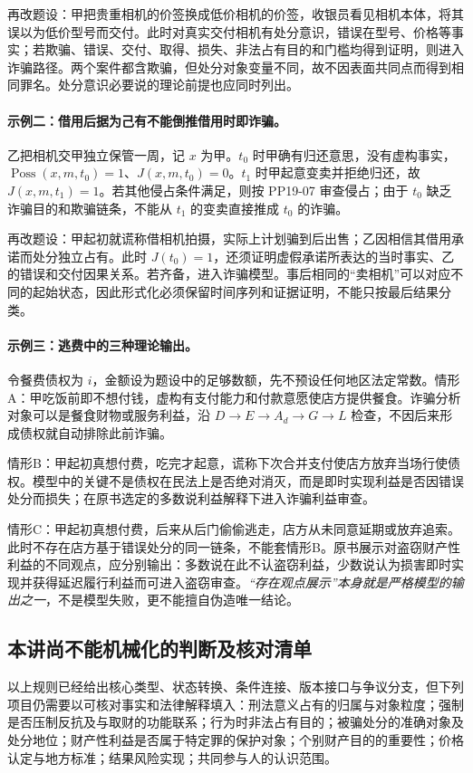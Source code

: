 再改题设：甲把贵重相机的价签换成低价相机的价签，收银员看见相机本体，将其误以为低价型号而交付。此时对真实交付相机有处分意识，错误在型号、价格等事实；若欺骗、错误、交付、取得、损失、非法占有目的和门槛均得到证明，则进入诈骗路径。两个案件都含欺骗，但处分对象变量不同，故不因表面共同点而得到相同罪名。处分意识必要说的理论前提也应同时列出。

\paragraph{示例二：借用后据为己有不能倒推借用时即诈骗。}
\mbox{}\par
乙把相机交甲独立保管一周，记 $x$ 为甲。$t_0$ 时甲确有归还意思，没有虚构事实，$\operatorname{Poss}(x,m,t_0)=1$、$J(x,m,t_0)=0$。$t_1$ 时甲起意变卖并拒绝归还，故 $J(x,m,t_1)=1$。若其他侵占条件满足，则按 PP19-07 审查侵占；由于 $t_0$ 缺乏诈骗目的和欺骗链条，不能从 $t_1$ 的变卖直接推成 $t_0$ 的诈骗。

再改题设：甲起初就谎称借相机拍摄，实际上计划骗到后出售；乙因相信其借用承诺而处分独立占有。此时 $J(t_0)=1$，还须证明虚假承诺所表达的当时事实、乙的错误和交付因果关系。若齐备，进入诈骗模型。事后相同的“卖相机”可以对应不同的起始状态，因此形式化必须保留时间序列和证据证明，不能只按最后结果分类。

\paragraph{示例三：逃费中的三种理论输出。}
\mbox{}\par
令餐费债权为 $i$，金额设为题设中的足够数额，先不预设任何地区法定常数。情形A：甲吃饭前即不想付钱，虚构有支付能力和付款意愿使店方提供餐食。诈骗分析对象可以是餐食财物或服务利益，沿 $D\to E\to A_d\to G\to L$ 检查，不因后来形成债权就自动排除此前诈骗。

情形B：甲起初真想付费，吃完才起意，谎称下次合并支付使店方放弃当场行使债权。模型中的关键不是债权在民法上是否绝对消灭，而是即时实现利益是否因错误处分而损失；在原书选定的多数说利益解释下进入诈骗利益审查。

情形C：甲起初真想付费，后来从后门偷偷逃走，店方从未同意延期或放弃追索。此时不存在店方基于错误处分的同一链条，不能套情形B。原书展示对盗窃财产性利益的不同观点，应分别输出：多数说在此不认盗窃利益，少数说认为损害即时实现并获得延迟履行利益而可进入盗窃审查。\emph{“存在观点展示”本身就是严格模型的输出之一}，不是模型失败，更不能擅自伪造唯一结论。

\subsection{本讲尚不能机械化的判断及核对清单}
以上规则已经给出核心类型、状态转换、条件连接、版本接口与争议分支，但下列项目仍需要以可核对事实和法律解释填入：刑法意义占有的归属与对象粒度；强制是否压制反抗及与取财的功能联系；行为时非法占有目的；被骗处分的准确对象及处分地位；财产性利益是否属于特定罪的保护对象；个别财产目的的重要性；价格认定与地方标准；结果风险实现；共同参与人的认识范围。

